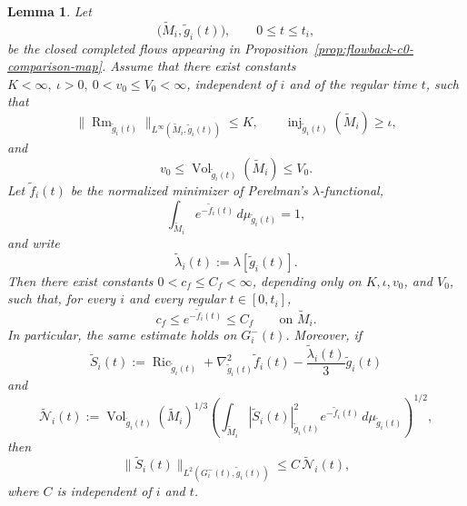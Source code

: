 \documentclass{amsart}
\newtheorem{lemma}{Lemma}[section]
\begin{document}
\begin{lemma}
\label{lem:uniform-perelman-ground-state}
Let
\[
        \bigl(\widetilde M_i,\widetilde g_i(t)\bigr),
        \qquad 0\leq t\leq t_i,
\]
be the closed completed flows appearing in Proposition~\ref{prop:flowback-c0-comparison-map}.
Assume that there exist constants
$K<\infty,~\iota>0,~0<v_0\leq V_0<\infty$,
independent of \(i\) and of the regular time \(t\), such that
\begin{equation}
\label{eq:uniform-completed-bounded-geometry}
        \bigl\|
                \operatorname{Rm}_{\widetilde g_i(t)}
        \bigr\|_{L^\infty(\widetilde M_i,\widetilde g_i(t))}
        \leq K,
        \qquad
        \operatorname{inj}_{\widetilde g_i(t)}(\widetilde M_i)
        \geq \iota,
\end{equation}
and
\begin{equation}
\label{eq:uniform-completed-volume-bounds}
        v_0
        \leq
        \operatorname{Vol}_{\widetilde g_i(t)}(\widetilde M_i)
        \leq
        V_0.
\end{equation}
Let \(\widetilde f_i(t)\) be the normalized minimizer of
Perelman's \(\lambda\)-functional,
\[
        \int_{\widetilde M_i}
        e^{-\widetilde f_i(t)}
        \,d\mu_{\widetilde g_i(t)}
        =1,
\]
and write
\[
        \widetilde\lambda_i(t)
        :=
        \lambda[\widetilde g_i(t)].
\]
Then there exist constants
$ 0<c_f\leq C_f<\infty$,
depending only on \(K,\iota,v_0\), and \(V_0\), such that, for
every \(i\) and every regular \(t\in[0,t_i]\),
\begin{equation}
\label{eq:uniform-perelman-density-bound}
        c_f
        \leq
        e^{-\widetilde f_i(t)}
        \leq
        C_f
        \qquad\text{on }\widetilde M_i.
\end{equation}
In particular, the same estimate holds on \(G_i^-(t)\).
Moreover, if
\[
        \widetilde S_i(t)
        :=
        \operatorname{Ric}_{\widetilde g_i(t)}
        +
        \nabla_{\widetilde g_i(t)}^2\widetilde f_i(t)
        -
        \frac{\widetilde\lambda_i(t)}{3}
        \widetilde g_i(t)
\]
and
\[
        \widetilde{\mathcal N}_i(t)
        :=
        \operatorname{Vol}_{\widetilde g_i(t)}
        (\widetilde M_i)^{1/3}
        \left(
        \int_{\widetilde M_i}
        |\widetilde S_i(t)|_{\widetilde g_i(t)}^2
        e^{-\widetilde f_i(t)}
        \,d\mu_{\widetilde g_i(t)}
        \right)^{1/2},
\]
then
\begin{equation}
\label{eq:weighted-to-unweighted-soliton-defect}
        \|\widetilde S_i(t)\|_
        {L^2(G_i^-(t),\widetilde g_i(t))}
        \leq
        C\,\widetilde{\mathcal N}_i(t),
\end{equation}
where \(C\) is independent of \(i\) and \(t\).
\end{lemma}
\end{document}
